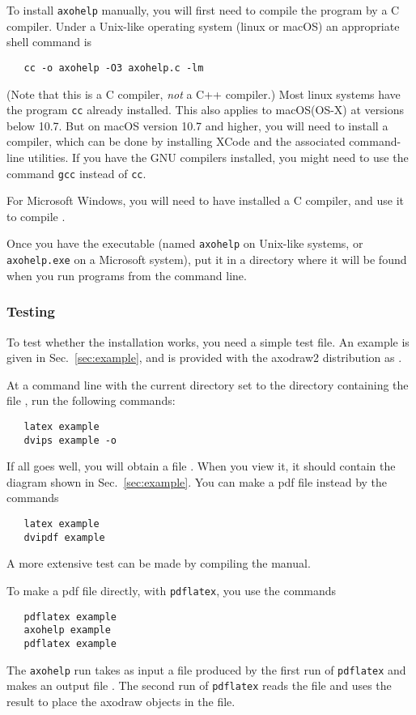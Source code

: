 \documentclass[12pt]{article}
\def\program#1{\texttt{#1}}
\begin{document}
To install \program{axohelp} manually, you will first need to compile
the program by a C compiler.  Under a Unix-like operating system
(linux or macOS) an appropriate shell command is
\begin{verbatim}
   cc -o axohelp -O3 axohelp.c -lm
\end{verbatim}
(Note that this is a C compiler, \emph{not} a C++ compiler.)  Most linux
systems have the program \program{cc} already installed.  This also applies to
macOS(OS-X) at versions below 10.7.  But on macOS version 10.7 and higher, you
will need to install a compiler, which can be done by installing XCode
and the associated command-line utilities.  If you have the GNU
compilers installed, you might need to use the command \program{gcc}
instead of \program{cc}.

For Microsoft Windows, you will need to have installed a C compiler,
and use it to compile .

Once you have the executable (named \program{axohelp} on Unix-like
systems, or \program{axohelp.exe} on a Microsoft system), put it in a
directory where it will be found when you run programs from the
command line.


\subsubsection{Testing}

To test whether the installation works, you need a simple test file.
An example is given in Sec.\ \ref{sec:example}, and is provided
with the axodraw2 distribution as .

At a command line with the current directory set to the directory
containing the file , run the following commands:
\begin{verbatim}
   latex example
   dvips example -o
\end{verbatim}
If all goes well, you will obtain a file .  When
you view it, it should contain the diagram shown in Sec.\
\ref{sec:example}.  You can make a pdf file instead by the commands
\begin{verbatim}
   latex example
   dvipdf example
\end{verbatim}
A more extensive test can be made by compiling the manual.

To make a pdf file directly, with \program{pdflatex}, you use the commands
\begin{verbatim}
   pdflatex example
   axohelp example
   pdflatex example
\end{verbatim}
The \program{axohelp} run takes as input a file 
produced by the first run of \program{pdflatex} and makes an output
file .  The second run of \program{pdflatex} reads
the \file{example.ax2} file and uses the result to place the axodraw
objects in the \file{example.pdf} file.
\end{document}
